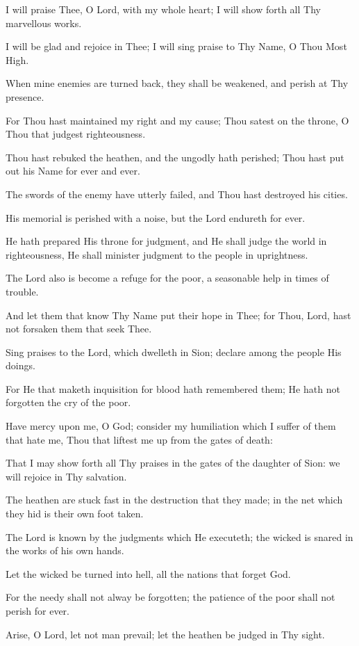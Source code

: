 I will praise Thee, O Lord, with my whole heart; I will show forth all Thy marvellous works.

I will be glad and rejoice in Thee; I will sing praise to Thy Name, O Thou Most High.

When mine enemies are turned back, they shall be weakened, and perish at Thy presence.

For Thou hast maintained my right and my cause; Thou satest on the throne, O Thou that judgest righteousness.

Thou hast rebuked the heathen, and the ungodly hath perished; Thou hast put out his Name for ever and ever.

The swords of the enemy have utterly failed, and Thou hast destroyed his cities.

His memorial is perished with a noise, but the Lord endureth for ever.

He hath prepared His throne for judgment, and He shall judge the world in righteousness, He shall minister judgment to the people in uprightness.

The Lord also is become a refuge for the poor, a seasonable help in times of trouble.

And let them that know Thy Name put their hope in Thee; for Thou, Lord, hast not forsaken them that seek Thee.

Sing praises to the Lord, which dwelleth in Sion; declare among the people His doings.

For He that maketh inquisition for blood hath remembered them; He hath not forgotten the cry of the poor.

Have mercy upon me, O God; consider my humiliation which I suffer of them that hate me, Thou that liftest me up from the gates of death:

That I may show forth all Thy praises in the gates of the daughter of Sion: we will rejoice in Thy salvation.

The heathen are stuck fast in the destruction that they made; in the net which they hid is their own foot taken.

The Lord is known by the judgments which He executeth; the wicked is snared in the works of his own hands.

Let the wicked be turned into hell, all the nations that forget God.

For the needy shall not alway be forgotten; the patience of the poor shall not perish for ever.

Arise, O Lord, let not man prevail; let the heathen be judged in Thy sight.

